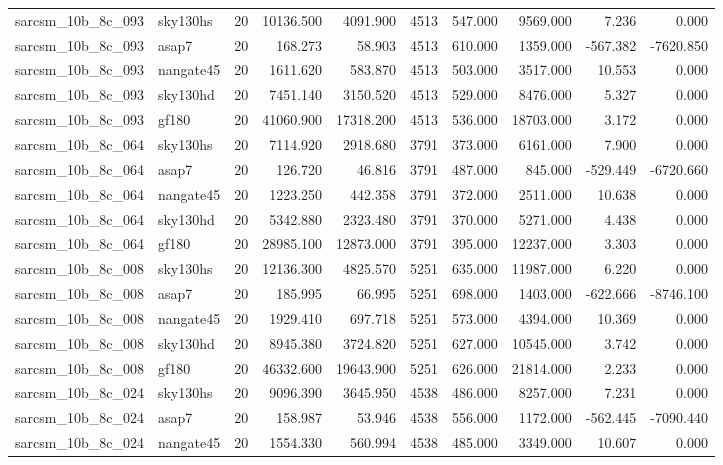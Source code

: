 \begin{longtable}{llrrrrrrrr}
sarcsm\_10b\_8c\_093 & sky130hs & 20 & 10136.500 & 4091.900 & 4513 & 547.000 & 9569.000 & 7.236 & 0.000 \\
sarcsm\_10b\_8c\_093 & asap7 & 20 & 168.273 & 58.903 & 4513 & 610.000 & 1359.000 & -567.382 & -7620.850 \\
sarcsm\_10b\_8c\_093 & nangate45 & 20 & 1611.620 & 583.870 & 4513 & 503.000 & 3517.000 & 10.553 & 0.000 \\
sarcsm\_10b\_8c\_093 & sky130hd & 20 & 7451.140 & 3150.520 & 4513 & 529.000 & 8476.000 & 5.327 & 0.000 \\
sarcsm\_10b\_8c\_093 & gf180 & 20 & 41060.900 & 17318.200 & 4513 & 536.000 & 18703.000 & 3.172 & 0.000 \\
sarcsm\_10b\_8c\_064 & sky130hs & 20 & 7114.920 & 2918.680 & 3791 & 373.000 & 6161.000 & 7.900 & 0.000 \\
sarcsm\_10b\_8c\_064 & asap7 & 20 & 126.720 & 46.816 & 3791 & 487.000 & 845.000 & -529.449 & -6720.660 \\
sarcsm\_10b\_8c\_064 & nangate45 & 20 & 1223.250 & 442.358 & 3791 & 372.000 & 2511.000 & 10.638 & 0.000 \\
sarcsm\_10b\_8c\_064 & sky130hd & 20 & 5342.880 & 2323.480 & 3791 & 370.000 & 5271.000 & 4.438 & 0.000 \\
sarcsm\_10b\_8c\_064 & gf180 & 20 & 28985.100 & 12873.000 & 3791 & 395.000 & 12237.000 & 3.303 & 0.000 \\
sarcsm\_10b\_8c\_008 & sky130hs & 20 & 12136.300 & 4825.570 & 5251 & 635.000 & 11987.000 & 6.220 & 0.000 \\
sarcsm\_10b\_8c\_008 & asap7 & 20 & 185.995 & 66.995 & 5251 & 698.000 & 1403.000 & -622.666 & -8746.100 \\
sarcsm\_10b\_8c\_008 & nangate45 & 20 & 1929.410 & 697.718 & 5251 & 573.000 & 4394.000 & 10.369 & 0.000 \\
sarcsm\_10b\_8c\_008 & sky130hd & 20 & 8945.380 & 3724.820 & 5251 & 627.000 & 10545.000 & 3.742 & 0.000 \\
sarcsm\_10b\_8c\_008 & gf180 & 20 & 46332.600 & 19643.900 & 5251 & 626.000 & 21814.000 & 2.233 & 0.000 \\
sarcsm\_10b\_8c\_024 & sky130hs & 20 & 9096.390 & 3645.950 & 4538 & 486.000 & 8257.000 & 7.231 & 0.000 \\
sarcsm\_10b\_8c\_024 & asap7 & 20 & 158.987 & 53.946 & 4538 & 556.000 & 1172.000 & -562.445 & -7090.440 \\
sarcsm\_10b\_8c\_024 & nangate45 & 20 & 1554.330 & 560.994 & 4538 & 485.000 & 3349.000 & 10.607 & 0.000 \\

\end{longtable}
